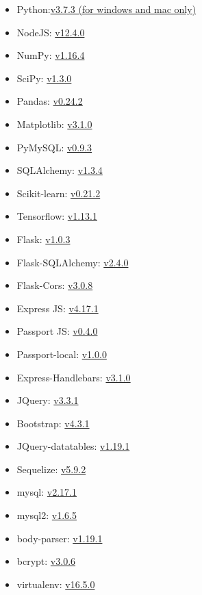 \documentclass[a4paper,12pt,oneside]{book}
\begin{document}
\begin{itemize}
\begin{itemize}
      \item Python:\href{https://www.python.org/downloads/release/python-373/}{v3.7.3 (for windows and mac only)}
      \item NodeJS: \href{https://nodejs.org/}{v12.4.0}
      \item NumPy: \href{https://pypi.org/project/numpy/}{v1.16.4}
      \item SciPy: \href{https://pypi.org/project/scipy/}{v1.3.0}
      \item Pandas: \href{https://pypi.org/project/pandas/}{v0.24.2}
      \item Matplotlib: \href{https://pypi.org/project/matplotlib/3.1.0/}{v3.1.0}
      \item PyMySQL: \href{https://pypi.org/project/PyMySQL/}{v0.9.3}
      \item SQLAlchemy: \href{https://pypi.org/project/SQLAlchemy/1.3.4/}{v1.3.4}
      \item Scikit-learn: \href{https://pypi.org/project/scikit-learn/}{v0.21.2}
      \item Tensorflow: \href{https://pypi.org/project/tensorflow/1.13.1/}{v1.13.1}
      \item Flask: \href{https://pypi.org/project/Flask/}{v1.0.3}
      \item Flask-SQLAlchemy: \href{https://pypi.org/project/flask-sqlalchemy/}{v2.4.0}
      \item Flask-Cors: \href{https://pypi.org/project/flask-cors/}{v3.0.8}
      \item Express JS: \href{https://www.npmjs.com/package/express}{v4.17.1}
      \item Passport JS: \href{https://www.npmjs.com/package/passport}{v0.4.0}
      \item Passport-local: \href{https://www.npmjs.com/package/passport-local}{v1.0.0}
      \item Express-Handlebars: \href{https://www.npmjs.com/package/express-handlebars}{v3.1.0}
      \item JQuery: \href{https://jquery.com/}{v3.3.1}
      \item Bootstrap: \href{https://getbootstrap.com/}{v4.3.1}
      \item JQuery-datatables: \href{https://datatables.net/}{v1.19.1}
      \item Sequelize: \href{https://www.npmjs.com/package/sequelize}{v5.9.2}
      \item mysql: \href{https://www.npmjs.com/package/mysql}{v2.17.1}
      \item mysql2: \href{https://www.npmjs.com/package/mysql2}{v1.6.5}
      \item body-parser: \href{https://www.npmjs.com/package/body-parser}{v1.19.1}
      \item bcrypt: \href{https://www.npmjs.com/package/bcrypt}{v3.0.6}
      \item virtualenv: \href{https://virtualenv.pypa.io/en/latest/changes/#v16-5-0-2019-04-24}{v16.5.0}
  \end{itemize}
  

\end{itemize}
\end{document}
